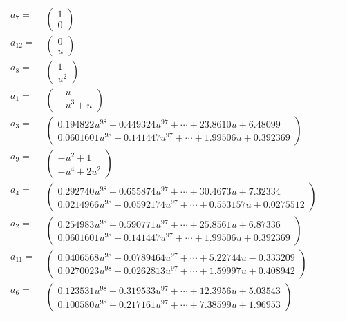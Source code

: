 \documentclass[1p]{elsarticle_modified}
\theoremstyle{definition}
\begin{document}
\begin{tabular}{m{7pt} m{180pt} m{7pt} m{180pt} }
\flushright $a_{7}=$&$\begin{pmatrix}1\\0\end{pmatrix}$ \\
\flushright $a_{12}=$&$\begin{pmatrix}0\\u\end{pmatrix}$ \\
\flushright $a_{8}=$&$\begin{pmatrix}1\\u^2\end{pmatrix}$ \\
\flushright $a_{1}=$&$\begin{pmatrix}- u\\- u^3+u\end{pmatrix}$ \\
\flushright $a_{3}=$&$\begin{pmatrix}0.194822 u^{98}+0.449324 u^{97}+\cdots+23.8610 u+6.48099\\0.0601601 u^{98}+0.141447 u^{97}+\cdots+1.99506 u+0.392369\end{pmatrix}$ \\
\flushright $a_{9}=$&$\begin{pmatrix}- u^2+1\\- u^4+2 u^2\end{pmatrix}$ \\
\flushright $a_{4}=$&$\begin{pmatrix}0.292740 u^{98}+0.655874 u^{97}+\cdots+30.4673 u+7.32334\\0.0214966 u^{98}+0.0592174 u^{97}+\cdots+0.553157 u+0.0275512\end{pmatrix}$ \\
\flushright $a_{2}=$&$\begin{pmatrix}0.254983 u^{98}+0.590771 u^{97}+\cdots+25.8561 u+6.87336\\0.0601601 u^{98}+0.141447 u^{97}+\cdots+1.99506 u+0.392369\end{pmatrix}$ \\
\flushright $a_{11}=$&$\begin{pmatrix}0.0406568 u^{98}+0.0789464 u^{97}+\cdots+5.22744 u-0.333209\\0.0270023 u^{98}+0.0262813 u^{97}+\cdots+1.59997 u+0.408942\end{pmatrix}$ \\
\flushright $a_{6}=$&$\begin{pmatrix}0.123531 u^{98}+0.319533 u^{97}+\cdots+12.3956 u+5.03543\\0.100580 u^{98}+0.217161 u^{97}+\cdots+7.38599 u+1.96953\end{pmatrix}$ \\

\end{tabular}
\end{document}
